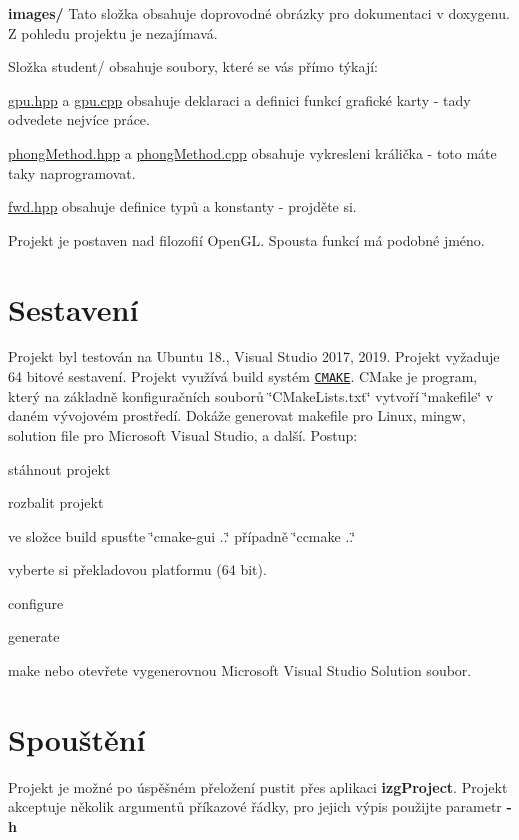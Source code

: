 {\bfseries images/} Tato složka obsahuje doprovodné obrázky pro dokumentaci v doxygenu. Z pohledu projektu je nezajímavá.

Složka student/ obsahuje soubory, které se vás přímo týkají\+:

\hyperlink{gpu_8hpp}{gpu.\+hpp} a \hyperlink{gpu_8cpp}{gpu.\+cpp} obsahuje deklaraci a definici funkcí grafické karty -\/ tady odvedete nejvíce práce.

\hyperlink{phongMethod_8hpp}{phong\+Method.\+hpp} a \hyperlink{phongMethod_8cpp}{phong\+Method.\+cpp} obsahuje vykresleni králička -\/ toto máte taky naprogramovat.

\hyperlink{fwd_8hpp}{fwd.\+hpp} obsahuje definice typů a konstanty -\/ projděte si.

Projekt je postaven nad filozofií Open\+GL. Spousta funkcí má podobné jméno.\hypertarget{index_sestaveni}{}\section{Sestavení}\label{index_sestaveni}
Projekt byl testován na Ubuntu 18., Visual Studio 2017, 2019. Projekt vyžaduje 64 bitové sestavení. Projekt využívá build systém \href{https://cmake.org/}{\tt C\+M\+A\+KE}. C\+Make je program, který na základně konfiguračních souborů \char`\"{}\+C\+Make\+Lists.\+txt\char`\"{} vytvoří \char`\"{}makefile\char`\"{} v daném vývojovém prostředí. Dokáže generovat makefile pro Linux, mingw, solution file pro Microsoft Visual Studio, a další. Postup\+:
\begin{DoxyEnumerate}
\item stáhnout projekt
\item rozbalit projekt
\item ve složce build spusťte \char`\"{}cmake-\/gui ..\char`\"{} případně \char`\"{}ccmake ..\char`\"{}
\item vyberte si překladovou platformu (64 bit).
\item configure
\item generate
\item make nebo otevřete vygenerovnou Microsoft Visual Studio Solution soubor.
\end{DoxyEnumerate}\hypertarget{index_spousteni}{}\section{Spouštění}\label{index_spousteni}
Projekt je možné po úspěšném přeložení pustit přes aplikaci {\bfseries izg\+Project}. Projekt akceptuje několik argumentů příkazové řádky, pro jejich výpis použijte parametr {\bfseries  -\/h }
